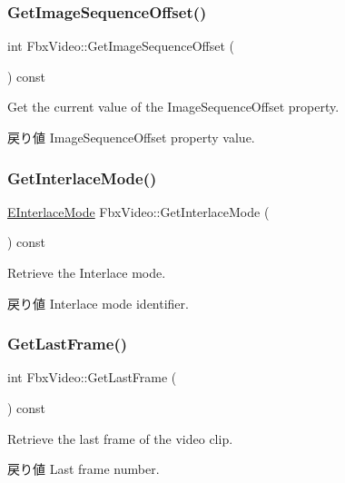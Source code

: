 \subsubsection{\texorpdfstring{Get\+Image\+Sequence\+Offset()}{GetImageSequenceOffset()}}
{\footnotesize\ttfamily int Fbx\+Video\+::\+Get\+Image\+Sequence\+Offset (\begin{DoxyParamCaption}{ }\end{DoxyParamCaption}) const}

Get the current value of the Image\+Sequence\+Offset property. \begin{DoxyReturn}{戻り値}
Image\+Sequence\+Offset property value. 
\end{DoxyReturn}
\mbox{\label{class_fbx_video_ac86d64d43fd683b6573b4bfa636aa9d1}} 
\subsubsection{\texorpdfstring{Get\+Interlace\+Mode()}{GetInterlaceMode()}}
{\footnotesize\ttfamily \hyperlink{class_fbx_video_a1e60229c28a15e29289f3f00b23aa215}{E\+Interlace\+Mode} Fbx\+Video\+::\+Get\+Interlace\+Mode (\begin{DoxyParamCaption}{ }\end{DoxyParamCaption}) const}

Retrieve the Interlace mode. \begin{DoxyReturn}{戻り値}
Interlace mode identifier. 
\end{DoxyReturn}
\mbox{\label{class_fbx_video_abcc991da628ef1ae31f15a64d773e8be}} 
\subsubsection{\texorpdfstring{Get\+Last\+Frame()}{GetLastFrame()}}
{\footnotesize\ttfamily int Fbx\+Video\+::\+Get\+Last\+Frame (\begin{DoxyParamCaption}{ }\end{DoxyParamCaption}) const}

Retrieve the last frame of the video clip. \begin{DoxyReturn}{戻り値}
Last frame number. 
\end{DoxyReturn}
\mbox{\label{class_fbx_video_a6b78fbe7939fb49f51c1d381fe927816}} 
